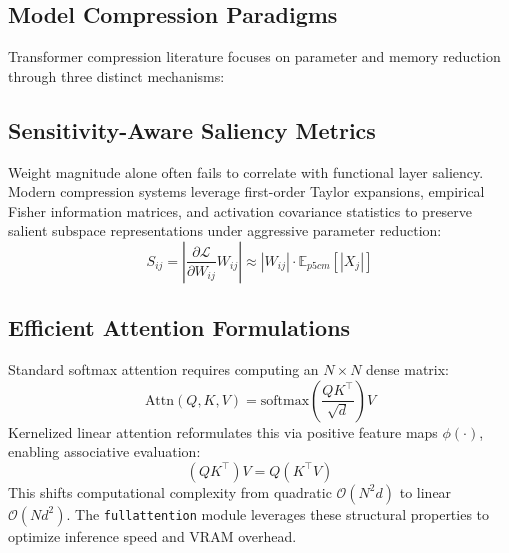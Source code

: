 {\subsection{Model Compression Paradigms}
Transformer compression literature focuses on parameter and memory reduction through three distinct mechanisms:

\subsection{Sensitivity-Aware Saliency Metrics}
Weight magnitude alone often fails to correlate with functional layer saliency. Modern compression systems leverage first-order Taylor expansions, empirical Fisher information matrices, and activation covariance statistics to preserve salient subspace representations under aggressive parameter reduction:
\[
S_{ij} = \left| \frac{\partial \mathcal{L}}{\partial W_{ij}} W_{ij} \right| \approx |W_{ij}| \cdot \mathbb{E}_{p{5cm}}[|X_j|]
\]

\subsection{Efficient Attention Formulations}
Standard softmax attention requires computing an $N \times N$ dense matrix:
\[
\text{Attn}(Q, K, V) = \text{softmax}\left(\frac{Q K^\top}{\sqrt{d}}\right) V
\]
Kernelized linear attention reformulates this via positive feature maps $\phi(\cdot)$, enabling associative evaluation:
\[
(Q K^\top) V = Q (K^\top V)
\]
This shifts computational complexity from quadratic $(N^2 d)$ to linear $(N d^2)$. The \texttt{fullattention} module leverages these structural properties to optimize inference speed and VRAM overhead.


}
